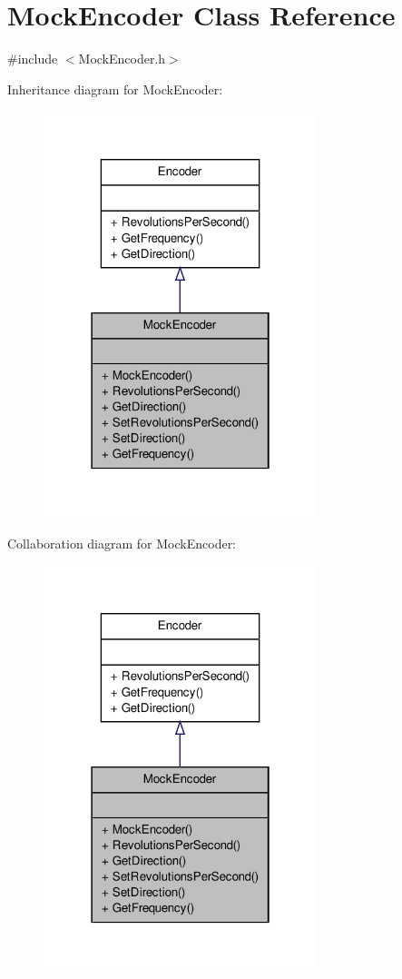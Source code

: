 \hypertarget{class_mock_encoder}{\section{Mock\-Encoder Class Reference}
\label{class_mock_encoder}
}


{\ttfamily \#include $<$Mock\-Encoder.\-h$>$}



Inheritance diagram for Mock\-Encoder\-:
\nopagebreak
\begin{figure}[H]
\begin{center}
\leavevmode
\includegraphics[width=226pt]{class_mock_encoder__inherit__graph}
\end{center}
\end{figure}


Collaboration diagram for Mock\-Encoder\-:
\nopagebreak
\begin{figure}[H]
\begin{center}
\leavevmode
\includegraphics[width=226pt]{class_mock_encoder__coll__graph}
\end{center}
\end{figure}
